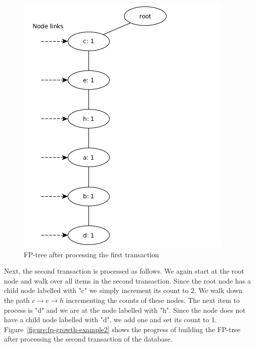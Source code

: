 \begin{figure}[!htbp]
	\centering
	\includegraphics[scale=0.5]{fp-tree-example/fp-tree-p1.png}
	\caption{FP-tree after processing the first transaction}
	\label{figure:fp-growth-example1}
\end{figure}

Next, the second transaction is processed as follows. We again start at the root node and walk over all items in the second transaction. Since the root node has a child node labelled with "c" we simply increment its count to 2. We walk down the path $c \rightarrow e \rightarrow h$ incrementing the counts of these nodes. The next  item to process is "d" and we are at the node labelled with "h". Since the node does not have a child node labelled with "d", we add one and set its count to 1. Figure~\ref{figure:fp-growth-example2} shows the progress of building the FP-tree after processing the second transaction of the database.


